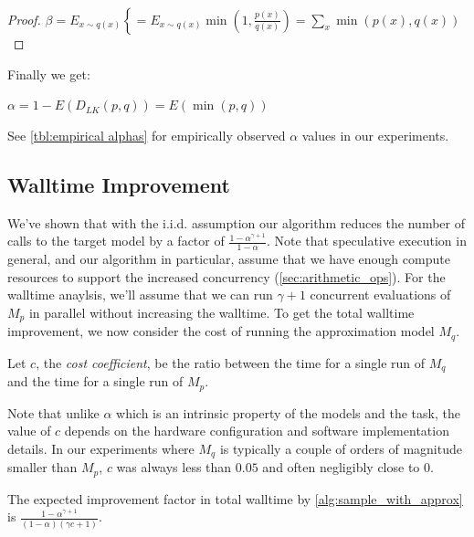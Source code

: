 \begin{proof}
$\beta = E_{x \sim q(x)}\left\lbrace
\right. = E_{x \sim q(x)}\min(1, \frac{p(x)}{q(x)}) =
\sum_x\min(p(x), q(x))$
\end{proof}

Finally we get:

\begin{corollary}
\label{thm:dlk_alpha}
$\alpha = 1 - E(D_{LK}(p, q)) = E(\min(p, q))$
\end{corollary}

See \ref{tbl:empirical alphas} for empirically observed $\alpha$ values in our experiments.

\subsection{Walltime Improvement}
\label{sec:latency_imp}

We've shown that with the i.i.d. assumption our algorithm reduces the number of calls to the target model by a factor of $\frac{1 - \alpha^{\gamma + 1}}{1 - \alpha}$.
Note that speculative execution in general, and our algorithm in particular, assume that we have enough compute resources to support the increased concurrency (\ref{sec:arithmetic_ops}). For the walltime anaylsis, we'll assume that we can run $\gamma + 1$ concurrent evaluations of $M_p$ in parallel without increasing the walltime. To get the total walltime improvement, we now consider the cost of running the approximation model $M_q$.

\begin{definition}
\label{def:c}
Let $c$, the \emph{cost coefficient}, be the ratio between the time for a single run of $M_q$ and the time for a single run of $M_p$.
\end{definition}

Note that unlike $\alpha$ which is an intrinsic property of the models and the task, the value of $c$ depends on the hardware configuration and software implementation details. In our experiments where $M_q$ is typically a couple of orders of magnitude smaller than $M_p$, $c$ was always less than $0.05$ and often negligibly close to 0.

\begin{theorem}
\label{thm:total_walltime}
The expected improvement factor in total walltime by \ref{alg:sample_with_approx} is $\frac{1 - \alpha^{\gamma + 1}}{(1-\alpha)({\gamma}c + 1)}$.

\end{theorem}

